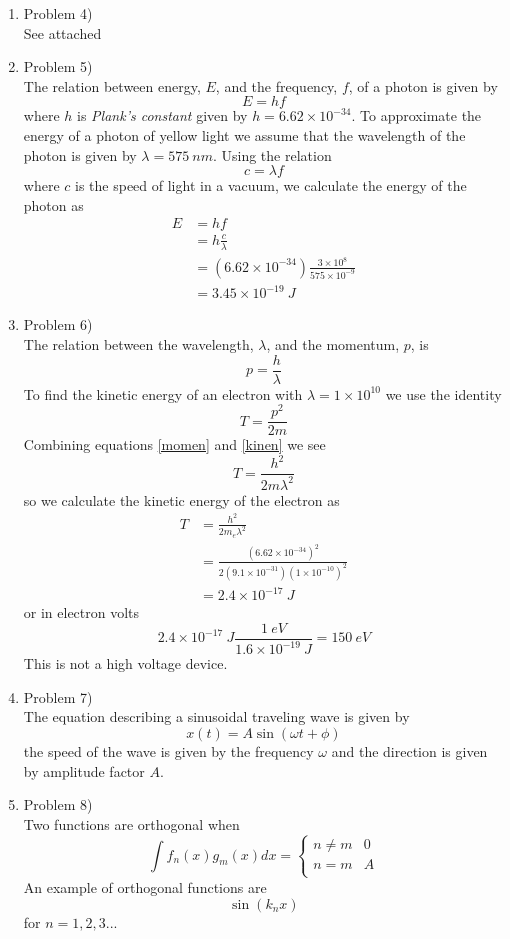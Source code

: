 \documentclass[11pt]{article}
\numberwithin{equation}{section}
\begin{document}
\begin{enumerate}
\item Problem 4)\\
See attached 

\item Problem 5)\\
The relation between energy, $E$, and the frequency, $f$, of a photon is given by
$$E = hf$$
where $h$ is \emph{Plank's constant} given by $h = 6.62\times10^{-34}$. To approximate the energy of a photon of yellow light we assume that the wavelength of the photon is given by $\lambda = 575\ nm$. Using the relation 
$$c = \lambda f$$
where $c$ is the speed of light in a vacuum, we calculate the energy of the photon as
\begin{align*}
E &= hf\\
&= h\frac{c}{\lambda}\\
&= (6.62\times10^{-34})\frac{3\times10^8}{575\times10^{-9}}\\
&= 3.45\times10^{-19}\ J
\end{align*}

\item Problem 6)\\
The relation between the wavelength, $\lambda$, and the momentum, $p$, is 
\begin{equation}
p = \frac{h}{\lambda}
\label{momen}
\end{equation}
To find the kinetic energy of an electron with $\lambda = 1\times10^{10}$ we use the identity 
\begin{equation}
T = \frac{p^2}{2m}
\label{kinen}
\end{equation}
Combining equations \ref{momen} and \ref{kinen} we see
$$T = \frac{h^2}{2m\lambda^2}$$
so we calculate the kinetic energy of the electron as
\begin{align*}
T &= \frac{h^2}{2m_e\lambda^2}\\
&= \frac{(6.62\times10^{-34})^2}{2(9.1\times10^{-31})(1\times10^{-10})^2}\\
&= 2.4\times10^{-17}\ J
\end{align*}
or in electron volts 
$$2.4\times10^{-17}\ J\frac{1\ eV}{1.6\times10^{-19}\ J} = 150\ eV$$
This is not a high voltage device. 

\item Problem 7)\\
The equation describing a sinusoidal traveling wave is given by
$$x(t) = A\sin(\omega t+\phi)$$
the speed of the wave is given by the frequency $\omega$ and the direction is given by amplitude factor $A$. 

\item Problem 8)\\
Two functions are orthogonal when 
$$\int f_n(x)g_m(x)dx = \left\{\begin{array}{cc}
			n\ne m	&0\\
			n=m	&A\\
			\end{array}\right.$$
An example of orthogonal functions are
$$\sin(k_nx)$$
for $n = 1,2,3...$
\end{enumerate}
\end{document}
